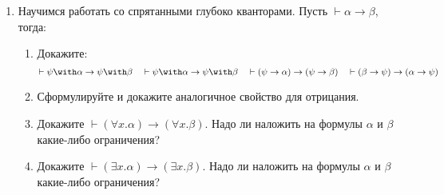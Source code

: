 \documentclass[10pt,a4paper,oneside]{article}
\begin{document}
\begin{enumerate}
\item Научимся работать со спрятанными глубоко кванторами. Пусть $\vdash\alpha\rightarrow\beta$, тогда:
\begin{enumerate}
\item Докажите: $$\vdash\psi\with\alpha \rightarrow \psi\with\beta\quad\vdash\psi\with\alpha \rightarrow \psi\with\beta\quad
\vdash(\psi\rightarrow\alpha) \rightarrow (\psi\rightarrow\beta)\quad\vdash(\beta\rightarrow\psi) \rightarrow (\alpha\rightarrow\psi)$$
\item Сформулируйте и докажите аналогичное свойство для отрицания.
\item Докажите $\vdash(\forall x.\alpha)\rightarrow(\forall x.\beta)$. 
Надо ли наложить на формулы $\alpha$ и $\beta$ какие-либо ограничения?
\item Докажите $\vdash(\exists x.\alpha)\rightarrow(\exists x.\beta)$. 
Надо ли наложить на формулы $\alpha$ и $\beta$ какие-либо ограничения?
\end{enumerate}

\end{enumerate}
\end{document}
